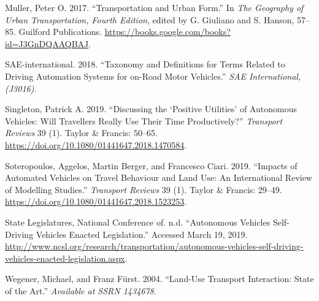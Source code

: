 \documentclass[12pt,]{article}
\begin{document}
\leavevmode\hypertarget{ref-Muller2017transportation}{}%
Muller, Peter O. 2017. ``Transportation and Urban Form.'' In \emph{The
Geography of Urban Transportation, Fourth Edition}, edited by G.
Giuliano and S. Hanson, 57--85. Guilford Publications.
\url{https://books.google.com/books?id=J3GnDQAAQBAJ}.

\leavevmode\hypertarget{ref-sae2018taxonomy}{}%
SAE-international. 2018. ``Taxonomy and Definitions for Terms Related to
Driving Automation Systems for on-Road Motor Vehicles.'' \emph{SAE
International,(J3016)}.

\leavevmode\hypertarget{ref-singleton2019discussing}{}%
Singleton, Patrick A. 2019. ``Discussing the `Positive Utilities' of
Autonomous Vehicles: Will Travellers Really Use Their Time
Productively?'' \emph{Transport Reviews} 39 (1). Taylor \& Francis:
50--65. \url{https://doi.org/10.1080/01441647.2018.1470584}.

\leavevmode\hypertarget{ref-soteropoulos2019impacts}{}%
Soteropoulos, Aggelos, Martin Berger, and Francesco Ciari. 2019.
``Impacts of Automated Vehicles on Travel Behaviour and Land Use: An
International Review of Modelling Studies.'' \emph{Transport Reviews} 39
(1). Taylor \& Francis: 29--49.
\url{https://doi.org/10.1080/01441647.2018.1523253}.

\leavevmode\hypertarget{ref-NCSL2019AV}{}%
State Legislatures, National Conference of. n.d. ``Autonomous Vehicles
\textbar{} Self-Driving Vehicles Enacted Legislation.'' Accessed March
19, 2019.
\url{http://www.ncsl.org/research/transportation/autonomous-vehicles-self-driving-vehicles-enacted-legislation.aspx}.

\leavevmode\hypertarget{ref-wegener2004land}{}%
Wegener, Michael, and Franz Fürst. 2004. ``Land-Use Transport
Interaction: State of the Art.'' \emph{Available at SSRN 1434678}.
\end{document}

